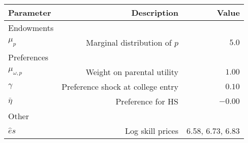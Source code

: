 \begin{tabular}{lrr}
\hline
Parameter & Description  & Value  \\ 
\hline
Endowments &   &   \\ 
$\mu_{p}$ & Marginal distribution of $p$  & $5.0$  \\ 
Preferences &   &   \\ 
$\mu_{\omega,p}$ & Weight on parental utility  & $1.00$  \\ 
$\gamma$ & Preference shock at college entry  & $0.10$  \\ 
$\bar{\eta}$ & Preference for HS  & $-0.00$  \\ 
Other &   &   \\ 
$\hat{e}{s}$ & Log skill prices  & 6.58, 6.73, 6.83  \\ 
\hline
\end{tabular}%
